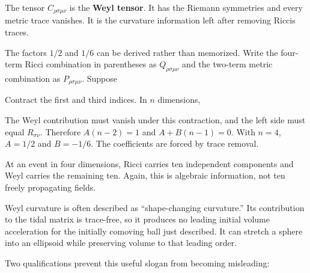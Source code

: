 \documentclass[
  11pt,
  letterpaper,
  oneside,
  openany]{scrbook}
\begin{document}
The tensor \(C_{\rho\sigma\mu\nu}\) is the \textbf{Weyl tensor}. It has
the Riemann symmetries and every metric trace vanishes. It is the
curvature information left after removing Ricci\textquotesingle s
traces.

The factors \(1/2\) and \(1/6\) can be derived rather than memorized.
Write the four-term Ricci combination in parentheses as
\(Q_{\rho\sigma\mu\nu}\) and the two-term metric combination as
\(P_{\rho\sigma\mu\nu}\). Suppose

\begin{center}
\begingroup
{}
\ifdim\wd\grmathbox>\linewidth
\resizebox{\linewidth}{!}{\usebox{\grmathbox}}
\else\usebox{\grmathbox}\fi
\endgroup
\end{center}

Contract the first and third indices. In \(n\) dimensions,

\begin{center}
\begingroup
{}
\ifdim\wd\grmathbox>\linewidth
\resizebox{\linewidth}{!}{\usebox{\grmathbox}}
\else\usebox{\grmathbox}\fi
\endgroup
\end{center}

The Weyl contribution must vanish under this contraction, and the left
side must equal \(R_{\sigma\nu}\). Therefore \(A(n-2)=1\) and
\(A+B(n-1)=0\). With \(n=4\), \(A=1/2\) and \(B=-1/6\). The coefficients
are forced by trace removal.

At an event in four dimensions, Ricci carries ten independent components
and Weyl carries the remaining ten. Again, this is algebraic
information, not ten freely propagating fields.

Weyl curvature is often described as ``shape-changing curvature.'' Its
contribution to the tidal matrix is trace-free, so it produces no
leading initial volume acceleration for the initially comoving ball just
described. It can stretch a sphere into an ellipsoid while preserving
volume to that leading order.

Two qualifications prevent this useful slogan from becoming misleading:
\end{document}
